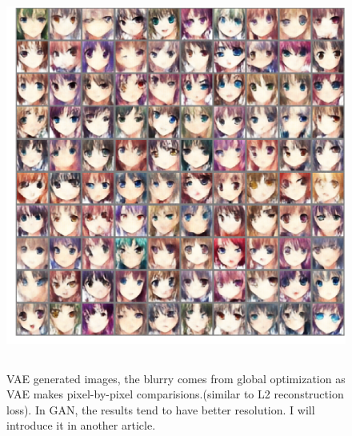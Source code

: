 \documentclass{article}
\begin{document}
\begin{figure}[H]
\centering
\includegraphics[width=5in,height=5in]{result1}
\caption{VAE generated images, the blurry comes from global optimization as VAE makes pixel-by-pixel comparisions.(similar to L2 reconstruction loss). In GAN, the results tend to have better resolution. I will introduce it in another article.}
\end{figure}


\end{document}

